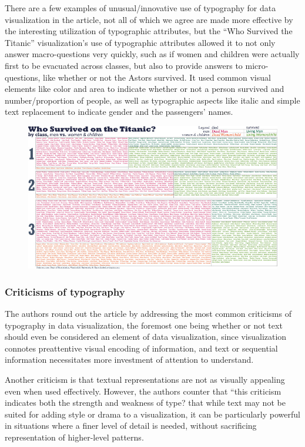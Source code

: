 \documentclass[]{book}
\theoremstyle{definition}
\theoremstyle{definition}
\theoremstyle{definition}
\theoremstyle{remark}
\begin{document}
There are a few examples of unusual/innovative use of typography for
data visualization in the article, not all of which we agree are made
more effective by the interesting utilization of typographic attributes,
but the ``Who Survived the Titanic'' visualization's use of typographic
attributes allowed it to not only answer macro-questions very quickly,
such as if women and children were actually first to be evacuated across
classes, but also to provide answers to micro-questions, like whether or
not the Astors survived. It used common visual elements like color and
area to indicate whether or not a person survived and number/proportion
of people, as well as typographic aspects like italic and simple text
replacement to indicate gender and the passengers' names.

\begin{figure}
\centering
\includegraphics{images/TypographicTitanic.jpg}
\caption{}
\end{figure}

\subsubsection{Criticisms of typography}\label{criticisms-of-typography}

The authors round out the article by addressing the most common
criticisms of typography in data visualization, the foremost one being
whether or not text should even be considered an element of data
visualization, since visualization connotes preattentive visual encoding
of information, and text or sequential information necessitates more
investment of attention to understand.

Another criticism is that textual representations are not as visually
appealing even when used effectively. However, the authors counter that
``this criticism indicates both the strength and weakness of type? that
while text may not be suited for adding style or drama to a
visualization, it can be particularly powerful in situations where a
finer level of detail is needed, without sacrificing representation of
higher-level patterns.
\end{document}
